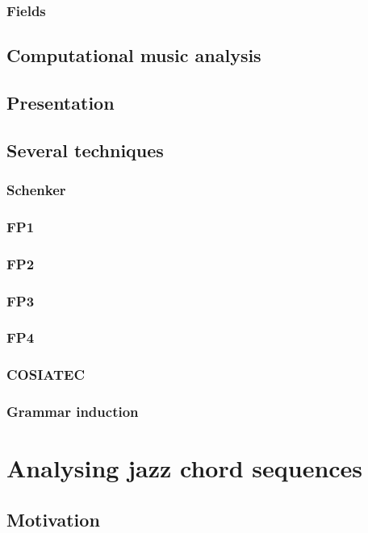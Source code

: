 \documentclass[a4paper,10pt]{article}
\begin{document}
\subsubsection{Fields}

\subsection{Computational music analysis}
\subsection{Presentation}

\subsection{Several techniques}
\subsubsection{Schenker} %
\subsubsection{FP1}
\subsubsection{FP2}
\subsubsection{FP3}
\subsubsection{FP4}
\subsubsection{COSIATEC}
\subsubsection{Grammar induction}


\section{Analysing jazz chord sequences}

\subsection{Motivation}
\end{document}
